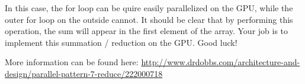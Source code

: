 \documentclass[11pt]{article}
\begin{document}
In this case, the for loop can be quire easily parallelized on the GPU, while the outer for loop on the outside cannot. 
It should be clear that by performing this operation, the sum will appear in the first element of the array.
Your job is to implement this summation / reduction on the GPU. Good luck!

More information can be found here: \url{http://www.drdobbs.com/architecture-and-design/parallel-pattern-7-reduce/222000718}
\end{document}
